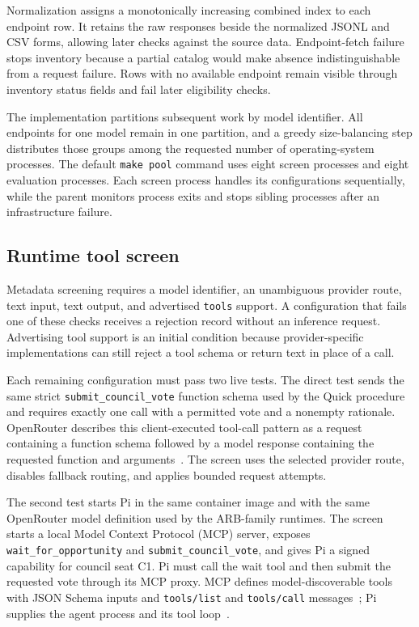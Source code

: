 \documentclass[11pt]{article}
\newcommand{\code}[1]{\texttt{#1}}
\begin{document}
Normalization assigns a monotonically increasing combined index to each endpoint row.  It retains the raw responses beside the normalized JSONL and CSV forms, allowing later checks against the source data.  Endpoint-fetch failure stops inventory because a partial catalog would make absence indistinguishable from a request failure.  Rows with no available endpoint remain visible through inventory status fields and fail later eligibility checks.

The implementation partitions subsequent work by model identifier.  All endpoints for one model remain in one partition, and a greedy size-balancing step distributes those groups among the requested number of operating-system processes.  The default \code{make pool} command uses eight screen processes and eight evaluation processes.  Each screen process handles its configurations sequentially, while the parent monitors process exits and stops sibling processes after an infrastructure failure.

\subsection{Runtime tool screen}

Metadata screening requires a model identifier, an unambiguous provider route, text input, text output, and advertised \code{tools} support.  A configuration that fails one of these checks receives a rejection record without an inference request.  Advertising tool support is an initial condition because provider-specific implementations can still reject a tool schema or return text in place of a call.

Each remaining configuration must pass two live tests.  The direct test sends the same strict \code{submit\_council\_vote} function schema used by the Quick procedure and requires exactly one call with a permitted vote and a nonempty rationale.  OpenRouter describes this client-executed tool-call pattern as a request containing a function schema followed by a model response containing the requested function and arguments~\cite{openrouter-tools}.  The screen uses the selected provider route, disables fallback routing, and applies bounded request attempts.

The second test starts Pi in the same container image and with the same OpenRouter model definition used by the ARB-family runtimes.  The screen starts a local Model Context Protocol (MCP) server, exposes \code{wait\_for\_opportunity} and \code{submit\_council\_vote}, and gives Pi a signed capability for council seat C1.  Pi must call the wait tool and then submit the requested vote through its MCP proxy.  MCP defines model-discoverable tools with JSON Schema inputs and \code{tools/list} and \code{tools/call} messages~\cite{mcp-tools}; Pi supplies the agent process and its tool loop~\cite{pi-agent}.
\end{document}
